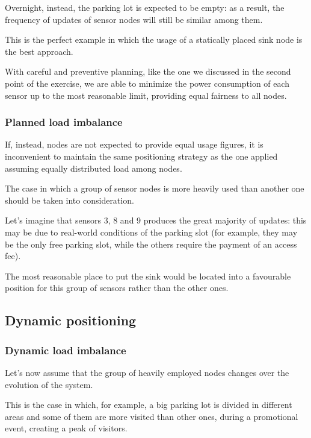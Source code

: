 \documentclass[a4paper,11pt]{article} %
\begin{document}
    Overnight, instead, the parking lot is expected to be empty: as a result, the frequency of updates of sensor nodes will still be similar among them.

    This is the perfect example in which the usage of a statically placed sink node is the best approach.

    With careful and preventive planning, like the one we discussed in the second point of the exercise, we are able to minimize the power consumption of each sensor up to the most reasonable limit, providing equal fairness to all nodes.

    \subsubsection{Planned load imbalance}

    If, instead, nodes are not expected to provide equal usage figures, it is inconvenient to maintain the same positioning strategy as the one applied assuming equally distributed load among nodes.

    The case in which a group of sensor nodes is more heavily used than another one should be taken into consideration.

    Let's imagine that sensors 3, 8 and 9 produces the great majority of updates: this may be due to real-world conditions of the parking slot (for example, they may be the only free parking slot, while the others require the payment of an access fee).

    The most reasonable place to put the sink would be located into a favourable position for this group of sensors rather than the other ones.

    \subsection{Dynamic positioning}\label{subsec:dynamic-positioning}

    \subsubsection{Dynamic load imbalance}

    Let's now assume that the group of heavily employed nodes changes over the evolution of the system.

    This is the case in which, for example, a big parking lot is divided in different areas and some of them are more visited than other ones, during a promotional event, creating a peak of visitors.
\end{document}

